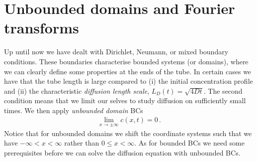 \section{Unbounded domains and Fourier transforms}
Up until now we have dealt with Dirichlet, Neumann, or mixed boundary conditions. 
These boundaries characterise bounded systems (or domains), where we can clearly define some properties at the ends of the tube. 
In certain cases we have that the tube length is large compared to (i) the initial concentration profile and 
(ii) the characteristic \emph{diffusion length scale}, $L_D(t) = \sqrt{4 D t}$. 
The second condition means that we limit our selves to study diffusion on sufficiently small times. 
We then apply \emph{unbounded domain}  BCs    
\begin{eqnarray}
	\lim_{x \rightarrow \pm \infty} c(x,t) = 0  \, .
\end{eqnarray}
Notice that for unbounded domains we shift the coordinate systems such that we have $-\infty < x < \infty$ 
rather than $0 \leq x < \infty$. As for bounded BCs we need some prerequisites 
before we can solve the diffusion equation with unbounded BCs. 

